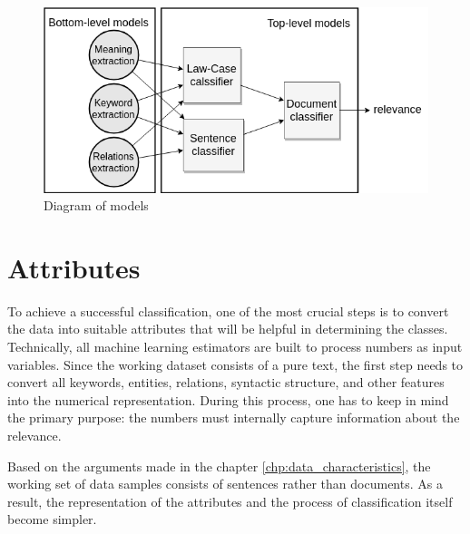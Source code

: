 \documentclass[
  digital, %
  notable,   %
  nolof,     %
  nolot,     %
]{fithesis3}
\begin{document}
\begin{figure}[H]
\caption{Diagram of models}
\label{fig:models-diagram}
\includegraphics[width=\textwidth]{img/models-diagram}
\end{figure}

\section{Attributes}
\label{sec:attributes}
To achieve a successful classification, one of the most crucial steps is to convert the data into suitable attributes that will be helpful in determining the classes.
Technically, all machine learning estimators are built to process numbers as input variables.
Since the working dataset consists of a pure text, the first step needs to convert all keywords, entities, relations, syntactic structure, and other features into the numerical representation.
During this process, one has to keep in mind the primary purpose: the numbers must internally capture information about the relevance.

Based on the arguments made in the chapter \ref{chp:data_characteristics}, the working set of data samples consists of sentences rather than documents.
As a result, the representation of the attributes and the process of classification itself become simpler.

\end{document}

